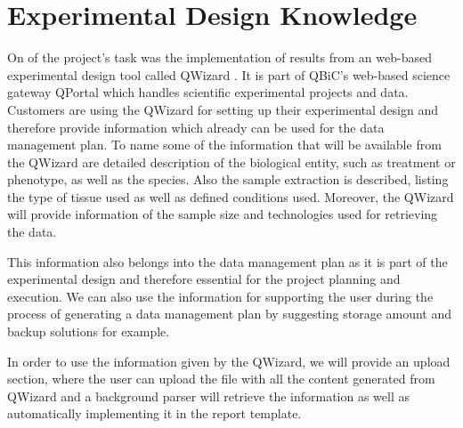 \section{Experimental Design Knowledge}
On of the project's task was the implementation of results from an web-based experimental design tool called QWizard \cite{qwizard}. It is part of QBiC's web-based science gateway QPortal which handles scientific experimental projects and data. Customers are using the QWizard for setting up their experimental design and therefore provide information which already can be used for the data management plan. To name some of the information that will be available from the QWizard are detailed description of the biological entity, such as treatment or phenotype, as well as the species. Also the sample extraction is described, listing the type of tissue used as well as defined conditions used. Moreover, the QWizard will provide information of the sample size and technologies used for retrieving the data.

This information also belongs into the data management plan as it is part of the experimental design and therefore essential for the project planning and execution. We can also use the information for supporting the user during the process of generating a data management plan by suggesting storage amount and backup solutions for example.

In order to use the information given by the QWizard, we will provide an upload section, where the user can upload the file with all the content generated from QWizard and a background parser will retrieve the information as well as automatically implementing it in the report template.